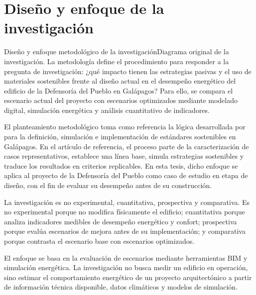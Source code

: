 



\section{Diseño y enfoque de la investigación}

\begin{textoDosTerciosGrafico}{\graficoDisenoEnfoqueMetodologia}{Diseño y enfoque metodológico de la investigación}{Diagrama original de la investigación.}
La metodología define el procedimiento para responder a la pregunta de investigación: ¿qué impacto tienen las estrategias pasivas y el uso de materiales sostenibles frente al diseño actual en el desempeño energético del edificio de la Defensoría del Pueblo en Galápagos? Para ello, se compara el escenario actual del proyecto con escenarios optimizados mediante modelado digital, simulación energética y análisis cuantitativo de indicadores.

El planteamiento metodológico toma como referencia la lógica desarrollada por \textcite{torres-barriusoSustainableBuildingStandards2025} para la definición, simulación e implementación de estándares sostenibles en Galápagos. En el artículo de referencia, el proceso parte de la caracterización de casos representativos, establece una línea base, simula estrategias sostenibles y traduce los resultados en criterios replicables. En esta tesis, dicho enfoque se aplica al proyecto de la Defensoría del Pueblo como caso de estudio en etapa de diseño, con el fin de evaluar su desempeño antes de su construcción.

La investigación es no experimental, cuantitativa, prospectiva y comparativa. Es no experimental porque no modifica físicamente el edificio; cuantitativa porque analiza indicadores medibles de desempeño energético y confort; prospectiva porque evalúa escenarios de mejora antes de su implementación; y comparativa porque contrasta el escenario base con escenarios optimizados.

El enfoque se basa en la evaluación de escenarios mediante herramientas BIM y simulación energética. La investigación no busca medir un edificio en operación, sino estimar el comportamiento energético de un proyecto arquitectónico a partir de información técnica disponible, datos climáticos y modelos de simulación.
\end{textoDosTerciosGrafico}

